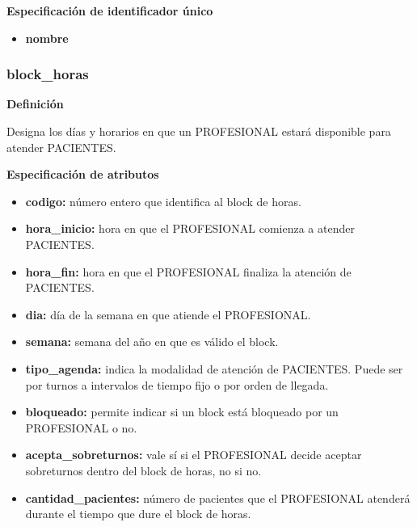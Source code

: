 \documentclass[a4paper,11pt]{article}
\begin{document}
\textbf{Especificación de identificador único}

\begin{itemize}

     \item \textbf{nombre}

\end{itemize}

\subsubsection{\textbf{block\_horas}}

\textbf{Definición}

Designa los días y horarios en que un PROFESIONAL estará disponible para atender 
PACIENTES.

\textbf{Especificación de atributos}

\begin{itemize}

     \item \textbf{codigo:} número entero que identifica al block de horas.

     \item \textbf{hora\_inicio:} hora en que el PROFESIONAL comienza a atender PACIENTES.

     \item \textbf{hora\_fin:} hora en que el PROFESIONAL finaliza la atención de PACIENTES.

     \item \textbf{dia:} día de la semana en que atiende el PROFESIONAL.

     \item \textbf{semana:} semana del año en que es válido el block.

     \item \textbf{tipo\_agenda:} indica la modalidad de atención de PACIENTES. Puede ser por 
     turnos a intervalos de tiempo fijo o por orden de llegada.

     \item \textbf{bloqueado:} permite indicar si un block está bloqueado por un PROFESIONAL o 
     no.

     \item \textbf{acepta\_sobreturnos:} vale sí si el PROFESIONAL decide aceptar sobreturnos dentro 
     del block de horas, no si no.

     \item \textbf{cantidad\_pacientes:} número de pacientes que el PROFESIONAL atenderá durante 
     el tiempo que dure el block de horas.

\end{itemize}
\end{document}
